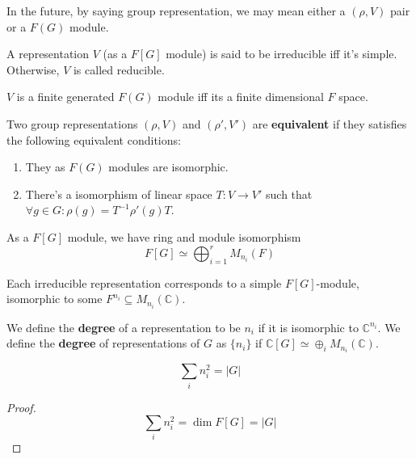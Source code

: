 \documentclass[12pt]{book}
\begin{document}
	In the future, by saying group representation, we may mean either a $(\rho,V)$ pair or a $F(G)$ module.
		
	\begin{definition}
		A representation $V$ (as a $F[G]$ module) is said to be irreducible iff it's simple. Otherwise, $V$ is called reducible.
	\end{definition}
	
	\begin{theorem}
		$V$ is a finite generated $F(G)$ module iff its a finite dimensional $F$ space.
	\end{theorem}
	
	\begin{definition}
		Two group representations $(\rho,V)$ and $(\rho',V')$ are {\bf equivalent} if they satisfies the following equivalent conditions:
		\begin{enumerate}
			\item They as $F(G)$ modules are isomorphic.
			\item There's a isomorphism of linear space $T:V\rightarrow V'$ such that $\forall g\in G: \rho(g)=T^{-1}\rho'(g) T$.
		\end{enumerate} 
	\end{definition}
	
	As a $F[G]$ module, we have ring and module isomorphism
	\begin{equation}
		F[G]\simeq \bigoplus_{i=1}^r M_{n_i}(F)
	\end{equation}
	
	Each irreducible representation corresponds to a simple $F[G]$-module, isomorphic to some $ F^{n_i}\subseteq M_{n_i}(\mathbb C)$.
	
	\begin{definition}
		We define the {\bf degree} of a representation to be $n_i$ if it is isomorphic to $\mathbb C^{n_i}$. We define the {\bf degree} of representations of $G$ as $\{n_i\}$ if $\mathbb C[G]\simeq \oplus_i M_{n_i}(\mathbb C)$.
	\end{definition}
	
	\begin{theorem}
		\begin{equation}
			\sum_i n_i^2=|G|
		\end{equation}
	\end{theorem}
	\begin{proof}
		\begin{equation}
			\sum_i n_i^2=\dim F[G]=|G|
		\end{equation}
	\end{proof}
	
\end{document}
